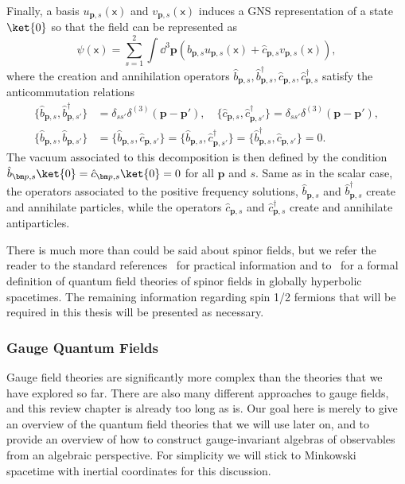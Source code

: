 \documentclass[letterpaper,12pt,titlepage,oneside,final]{book}
\newcommand{\mf}{\mathsf}%
\begin{document}
Finally, a basis $u_{\bm p,s}(\mf x)$ and $v_{\bm p, s}(\mf x)$ induces a GNS representation of a state $\ket{0}$ so that the field can be represented as
\begin{equation}
    \hat{\psi}(\mf x) = \sum_{s=1}^2 \int \dd^3 \bm p \left(\hat{b}_{\bm p,s} u_{\bm p,s}(\mf x) + \hat{c}_{\bm p,s} v_{\bm p,s}(\mf x)\right),    
\end{equation}
where the creation and annihilation operators $\hat{b}_{\bm p,s}, \hat{b}^\dagger_{\bm p,s}, \hat{c}_{\bm p,s}, \hat{c}^\dagger_{\bm p,s}$ satisfy the anticommutation relations
\begin{align}
    \{\hat{b}_{\bm p,s},\hat{b}^\dagger_{\bm p,s'}\} &= \delta_{ss'}\delta^{(3)}(\bm p - \bm p'), \quad \{\hat{c}_{\bm p,s},\hat{c}^\dagger_{\bm p,s'}\} = \delta_{ss'}\delta^{(3)}(\bm p - \bm p'),\\
    \{\hat{b}_{\bm p,s},\hat{b}_{\bm p,s'}\} & =\{\hat{b}_{\bm p,s},\hat{c}_{\bm p,s'}\} =\{\hat{b}_{\bm p,s},\hat{c}^\dagger_{\bm p,s'}\} =\{\hat{b}_{\bm p,s}^\dagger,\hat{c}_{\bm p,s'}\} = 0.
\end{align}
The vacuum associated to this decomposition is then defined by the condition $\hat{b}_{\bm p, s} \ket{0} = \hat{c}_{\bm p,s} \ket{0} = 0$ for all $\bm p$ and $s$. Same as in the scalar case, the operators associated to the positive frequency solutions, $\hat{b}_{\bm p,s}$ and $\hat{b}^\dagger_{\bm p,s}$ create and annihilate particles, while the operators $\hat{c}_{\bm p,s}$ and $\hat{c}^\dagger_{\bm p,s}$ create and annihilate antiparticles.

There is much more than could be said about spinor fields, but we refer the reader to the standard references~\cite{Peskin} for practical information and to~\cite{TheBookGoodChap} for a formal definition of quantum field theories of spinor fields in globally hyperbolic spacetimes. The remaining information regarding spin 1/2 fermions that will be required in this thesis will be presented as necessary.


\subsubsection*{Gauge Quantum Fields}


Gauge field theories are significantly more complex than the theories that we have explored so far. There are also many different approaches to gauge fields, and this review chapter is already too long as is. Our goal here is merely to give an overview of the quantum field theories that we will use later on, and to provide an overview of how to construct gauge-invariant algebras of observables from an algebraic perspective. For simplicity we will stick to Minkowski spacetime with inertial coordinates for this discussion.
\end{document}
